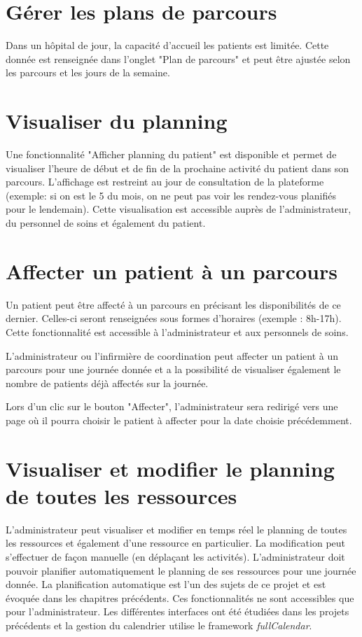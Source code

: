\documentclass[noposter]{polytech/polytech}
\begin{document}
\section{Gérer les plans de parcours}

Dans un hôpital de jour, la capacité d'accueil les patients est limitée. Cette donnée est renseignée dans l'onglet "Plan de parcours" et peut être ajustée selon les parcours et les jours de la semaine. 


\section{Visualiser du planning}

Une fonctionnalité "Afficher planning du patient" est disponible et permet de visualiser l'heure de début et de fin de la prochaine activité du patient dans son parcours. L'affichage est restreint au jour de consultation de la plateforme (exemple: si on est le 5 du mois, on ne peut pas voir les rendez-vous planifiés pour le lendemain). Cette visualisation est accessible auprès de l'administrateur, du personnel de soins et également du patient.


\section{Affecter un patient à un parcours}

Un patient peut être affecté à un parcours en précisant les disponibilités de ce dernier. Celles-ci seront renseignées sous formes d'horaires (exemple : 8h-17h). Cette fonctionnalité est accessible à l'administrateur et aux personnels de soins. 

L'administrateur ou l'infirmière de coordination peut affecter un patient à un parcours pour une journée donnée et a la possibilité de visualiser également le nombre de patients déjà affectés sur la journée.

Lors d'un clic sur le bouton "Affecter", l'administrateur sera redirigé vers une page où il pourra choisir le patient à affecter pour la date choisie précédemment.


\section{Visualiser et modifier le planning de toutes les ressources}

L'administrateur peut visualiser et modifier en temps réel le planning de toutes les ressources et également d'une ressource en particulier. La modification peut s'effectuer de façon manuelle (en déplaçant les activités). L'administrateur doit pouvoir planifier automatiquement le planning de ses ressources pour une journée donnée. La planification automatique est l'un des sujets de ce projet et est évoquée dans les chapitres précédents. Ces fonctionnalités ne sont accessibles que pour l'administrateur. Les différentes interfaces ont été étudiées dans les projets précédents et la gestion du calendrier utilise le framework \textit{fullCalendar}.
\end{document}
